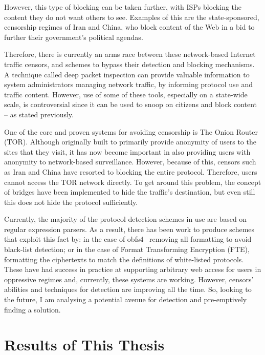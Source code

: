 \documentclass[ %
                    author={Samuel Russell},
                supervisor={Prof. Bogdan Warinschi},
                    degree={MEng},
                     title={Innocuous Ciphertexts},
                  subtitle={The DE-CENSOR Scheme},
                      type={research},
                      year={2018} ]{dissertation}
\begin{document}
However, this type of blocking can be taken further, with ISPs blocking the content they do not want others to see. Examples of this are the state-sponsored, censorship regimes of Iran and China, who block content of the Web in a bid to further their government's political agendas.

Therefore, there is currently an arms race between these network-based Internet traffic censors, and schemes to bypass their detection and blocking mechanisms.
A technique called deep packet inspection can provide valuable information to system administrators managing network traffic, by informing protocol use and traffic content.
However, use of some of these tools, especially on a state-wide scale, is controversial since it can be used to snoop on citizens and block content -- as stated previously.

One of the core and proven systems for avoiding censorship is The Onion Router (TOR).
Although originally built to primarily provide anonymity of users to the sites that they visit, it has now become important in also providing users with anonymity to network-based surveillance.
However, because of this, censors such as Iran and China have resorted to blocking the entire protocol.
Therefore, users cannot access the TOR network directly.
To get around this problem, the concept of bridges have been implemented to hide the traffic's destination, but even still this does not hide the protocol sufficiently.

Currently, the majority of the protocol detection schemes in use are based on regular expression parsers.
As a result, there has been work to produce schemes that exploit this fact by: in the case of obfs4~\cite{obfs4} removing all formatting to avoid black-list detection; or in the case of Format Transforming Encryption (FTE), formatting the ciphertexts to match the definitions of white-listed protocols.
These have had success in practice at supporting arbitrary web access for users in oppressive regimes and, currently, these systems are working.
However, censors' abilities and techniques for detection are improving all the time. So, looking to the future, I am analysing a potential avenue for detection and pre-emptively finding a solution.

\section{Results of This Thesis}
\end{document}
